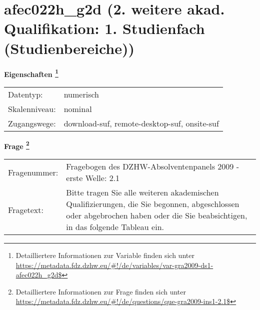 
    \setcounter{footnote}{0}

    \vspace*{-1.8cm}
	\section{afec022h\_g2d (2. weitere akad. Qualifikation: 1. Studienfach (Studienbereiche))}
	\label{section:afec022h_g2d}



    \vspace*{0.5cm}
    \noindent\textbf{Eigenschaften
	\footnote{Detailliertere Informationen zur Variable finden sich unter
		\url{https://metadata.fdz.dzhw.eu/\#!/de/variables/var-gra2009-ds1-afec022h_g2d$}}}\\
	\begin{tabularx}{\hsize}{@{}lX}
	Datentyp: & numerisch \\
	Skalenniveau: & nominal \\
	Zugangswege: &
	  download-suf, 
	  remote-desktop-suf, 
	  onsite-suf
 \\
    \end{tabularx}



				\vspace*{0.5cm}
                \noindent\textbf{Frage
	                \footnote{Detailliertere Informationen zur Frage finden sich unter
		              \url{https://metadata.fdz.dzhw.eu/\#!/de/questions/que-gra2009-ins1-2.1$}}}\\
				\begin{tabularx}{\hsize}{@{}lX}
					Fragenummer: &
					  Fragebogen des DZHW-Absolventenpanels 2009 - erste Welle:
					  2.1
 \\
					Fragetext: & Bitte tragen Sie alle weiteren akademischen Qualifizierungen, die Sie begonnen, abgeschlossen oder abgebrochen haben oder die Sie beabsichtigen, in das folgende Tableau ein. \\
				\end{tabularx}






